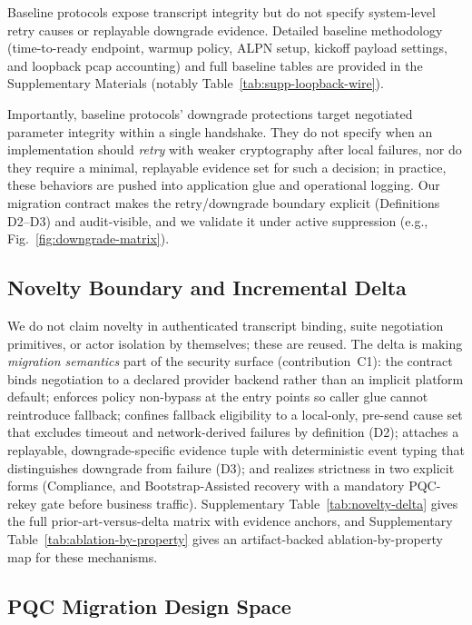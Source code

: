 \documentclass[10pt,journal,compsoc]{IEEEtran}
\begin{document}
Baseline protocols expose transcript integrity but do not specify
system-level retry causes or replayable downgrade evidence. Detailed
baseline methodology (time-to-ready endpoint, warmup policy, ALPN setup,
kickoff payload settings, and loopback pcap accounting) and full baseline
tables are provided in the Supplementary Materials (notably
Table~\ref{tab:supp-loopback-wire}).

Importantly, baseline protocols' downgrade protections target negotiated
parameter integrity within a single handshake. They do not specify when
an implementation should \emph{retry} with weaker cryptography after
local failures, nor do they require a minimal, replayable evidence set
for such a decision; in practice, these behaviors are pushed into
application glue and operational logging. Our migration contract makes
the retry/downgrade boundary explicit (Definitions D2--D3) and
audit-visible, and we validate it under active suppression (e.g.,
Fig.~\ref{fig:downgrade-matrix}).

\subsection{Novelty Boundary and Incremental
Delta}\label{sec:novelty-delta}

We do not claim novelty in authenticated transcript binding, suite
negotiation primitives, or actor isolation by themselves; these are
reused. The delta is making \emph{migration semantics} part of the
security surface (contribution~C1): the contract binds negotiation to a
declared provider backend rather than an implicit platform default;
enforces policy non-bypass at the entry points so caller glue cannot
reintroduce fallback; confines fallback eligibility to a local-only,
pre-send cause set that excludes timeout and network-derived failures by
definition (D2); attaches a replayable, downgrade-specific evidence
tuple with deterministic event typing that distinguishes downgrade from
failure (D3); and realizes strictness in two explicit forms (Compliance,
and Bootstrap-Assisted recovery with a mandatory PQC-rekey gate before
business traffic). Supplementary Table~\ref{tab:novelty-delta} gives the
full prior-art-versus-delta matrix with evidence anchors, and
Supplementary Table~\ref{tab:ablation-by-property} gives an
artifact-backed ablation-by-property map for these mechanisms.

\subsection{PQC Migration Design
Space}\label{sec:migration-design-space}
\end{document}
